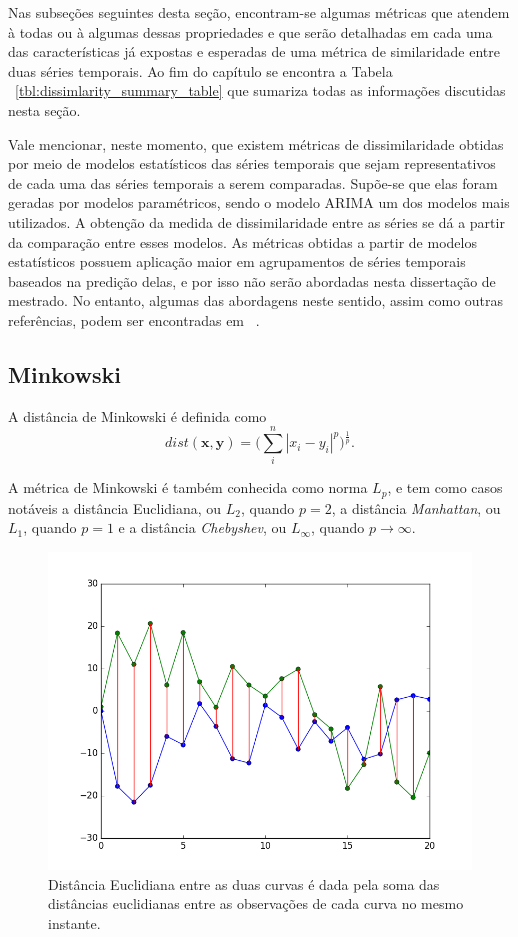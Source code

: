 Nas subseções seguintes desta seção, encontram-se algumas métricas que atendem à todas ou à algumas dessas propriedades e que serão detalhadas em cada uma das características já expostas e esperadas de uma métrica de similaridade entre duas séries temporais. Ao fim do capítulo se encontra a Tabela ~\ref{tbl:dissimlarity_summary_table} que sumariza todas  as informações discutidas nesta seção. 

Vale mencionar, neste momento, que existem métricas de dissimilaridade obtidas por meio de modelos estatísticos das séries temporais que sejam representativos de cada uma das séries temporais a serem comparadas. Supõe-se que elas foram geradas por modelos paramétricos, sendo o modelo ARIMA um dos modelos mais utilizados. A obtenção da medida de dissimilaridade entre as séries se dá a partir da comparação entre esses modelos. As métricas obtidas a partir de modelos estatísticos possuem aplicação maior em agrupamentos de séries temporais baseados na predição delas, e por isso não serão abordadas nesta dissertação de mestrado. No entanto, algumas das abordagens neste sentido, assim como outras referências, podem ser encontradas em ~\parencite{TSCLUST}.

\subsection{Minkowski}

A distância de Minkowski é definida como
\begin{equation}
dist(\bm{x},\bm{y}) = \bigg (\sum_{i}^{n} |x_i -y_i|^p \bigg)^{\frac{1}{p}}.
\end{equation}

A métrica de Minkowski é também conhecida como norma $L_p$, e tem como casos notáveis a distância Euclidiana, ou $L_2$, quando $p=2$, a distância \emph{Manhattan}, ou $L_1$, quando $p=1$ e a distância \emph{Chebyshev}, ou $L_\infty$, quando $p\to\infty$.

\begin{figure}[h!]
	  \includegraphics[width=\linewidth]{figuras/dist_euclidiana.png}
	  \caption{Distância Euclidiana entre as duas curvas é dada pela soma das distâncias euclidianas entre as observações de cada curva no mesmo instante.}
	  \label{fig:dist_euclidiana}
\end{figure}

